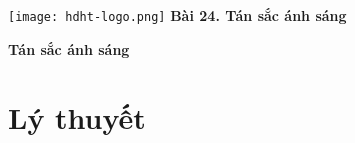 \newcommand{\chapter}[2][]{
	\newcommand{\chapname}{#2}
	\begin{flushleft}
		\begin{minipage}[t]{\linewidth}
			\texttt{[image: hdht-logo.png]}
			\hspace{0pt}	
			\sffamily\bfseries\large Bài  24. Tán sắc ánh sáng
			\begin{flushleft}
				\huge\bfseries #1
			\end{flushleft}
		\end{minipage}
	\end{flushleft}
	\vspace{1cm}
	\normalfont\normalsize
}
\chapter[Tán sắc ánh sáng]{Tán sắc ánh sáng}

\section{Lý thuyết}

